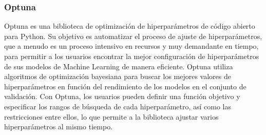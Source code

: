 \subsubsection{Optuna}
Optuna es una biblioteca de optimización de hiperparámetros de código abierto para Python. Su objetivo 
es automatizar el proceso de ajuste de hiperparámetros, que a menudo es un proceso intensivo en 
recursos y muy demandante en tiempo, para permitir a los usuarios encontrar la mejor configuración 
de hiperparámetros de sus modelos de Machine Learning de manera eficiente. Optuna utiliza algoritmos 
de optimización bayesiana para buscar los mejores valores de hiperparámetros en función del 
rendimiento de los modelos en el conjunto de validación. Con Optuna, los usuarios pueden definir una función 
objetivo y especificar los rangos de búsqueda de cada hiperparámetro, así como las restricciones entre ellos, 
lo que permite a la biblioteca ajustar varios hiperparámetros al mismo tiempo.

